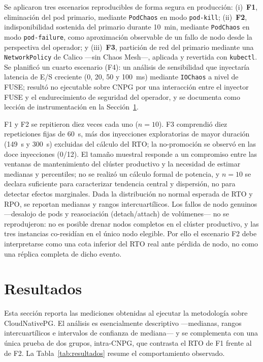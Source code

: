 \documentclass[a4paper]{llncs}
\begin{document}
Se aplicaron tres escenarios reproducibles de forma segura en producción:
(i)~\textbf{F1}, eliminación del pod primario, mediante \texttt{PodChaos} en modo
\texttt{pod-kill}; (ii)~\textbf{F2}, indisponibilidad sostenida del primario
durante 10~min, mediante \texttt{PodChaos} en modo \texttt{pod-failure}, como
aproximación observable de un fallo de nodo desde la perspectiva del operador; y
(iii)~\textbf{F3}, partición de red del primario mediante una
\texttt{NetworkPolicy} de Calico ---sin Chaos Mesh---, aplicada y revertida con
\texttt{kubectl}. Se planificó un cuarto escenario (F4): un análisis de
sensibilidad que inyectaría latencia de E/S creciente (0, 20, 50 y 100~ms)
mediante \texttt{IOChaos} a nivel de FUSE; resultó no ejecutable sobre CNPG por
una interacción entre el inyector FUSE y el endurecimiento de seguridad del
operador, y se documenta como lección de instrumentación en la
Sección~\ref{sec:resultados}.

F1 y F2 se repitieron diez veces cada uno ($n=10$). F3 comprendió diez
repeticiones fijas de 60~s, más dos inyecciones exploratorias de mayor duración
(149~s y 300~s) excluidas del cálculo del RTO; la no-promoción se observó en las
doce inyecciones (0/12). El tamaño muestral responde a un compromiso entre las
ventanas de mantenimiento del clúster productivo y la necesidad de estimar
medianas y percentiles; no se realizó un cálculo formal de potencia, y $n=10$ se
declara suficiente para caracterizar tendencia central y dispersión, no para
detectar efectos marginales. Dada la distribución no normal esperada de RTO y
RPO, se reportan medianas y rangos intercuartílicos. Los fallos de nodo genuinos
---desalojo de pods y reasociación (detach/attach) de volúmenes--- no se
reprodujeron: no es posible drenar nodos completos en el clúster productivo, y
las tres instancias co-residían en el único nodo elegible. Por ello el escenario
F2 debe interpretarse como una cota inferior del RTO real ante pérdida de nodo,
no como una réplica completa de dicho evento.

\section{Resultados}
\label{sec:resultados}

Esta sección reporta las mediciones obtenidas al ejecutar la metodología sobre
CloudNativePG. El análisis es esencialmente descriptivo ---medianas, rangos
intercuartílicos e intervalos de confianza de mediana--- y se complementa con una
única prueba de dos grupos, intra-CNPG, que contrasta el RTO de F1 frente al de
F2. La Tabla~\ref{tab:resultados} resume el comportamiento observado.
\end{document}
